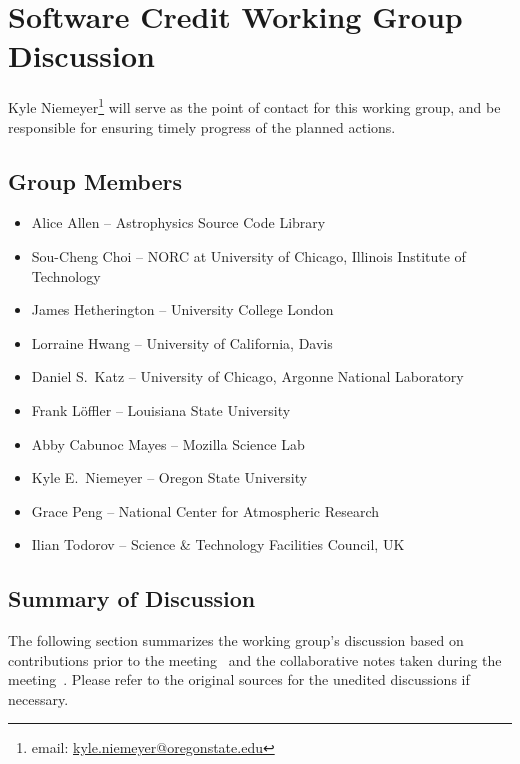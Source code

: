 \section{Software Credit Working Group Discussion}
\label{sec:appendix_SW_credit}

Kyle Niemeyer\footnote{email:
\href{mailto:kyle.niemeyer@oregonstate.edu}{kyle.niemeyer@oregonstate.edu}} will
serve as the point of contact for this working group, and be responsible for
ensuring timely progress of the planned actions.

\subsection{Group Members}

\begin{itemize}
\item Alice Allen -- Astrophysics Source Code Library
\item Sou-Cheng Choi -- NORC at University of Chicago, Illinois Institute of Technology
\item James Hetherington -- University College London
\item Lorraine Hwang -- University of California, Davis
\item Daniel S.\ Katz -- University of Chicago, Argonne National Laboratory
\item Frank L\"{o}ffler -- Louisiana State University
\item Abby Cabunoc Mayes -- Mozilla Science Lab
\item Kyle E.\ Niemeyer -- Oregon State University
\item Grace Peng -- National Center for Atmospheric Research
\item Ilian Todorov -- Science \& Technology Facilities Council, UK
\end{itemize}


\subsection{Summary of Discussion}

The following section summarizes the working group's discussion based on
contributions prior to the meeting~\cite{WSSSPE3-SC-github-issues} and the
collaborative notes taken during the meeting~\cite{WSSSPE3-SC-google-notes}.
Please refer to the original sources for the unedited discussions if necessary.

